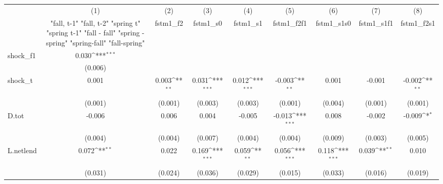 {
\def\sym#1{\ifmmode^{#1}\else\(^{#1}\)\fi}
\begin{tabular}{l*{8}{c}}
\toprule
            &\multicolumn{1}{c}{(1)}&\multicolumn{1}{c}{(2)}&\multicolumn{1}{c}{(3)}&\multicolumn{1}{c}{(4)}&\multicolumn{1}{c}{(5)}&\multicolumn{1}{c}{(6)}&\multicolumn{1}{c}{(7)}&\multicolumn{1}{c}{(8)}\\
            &\multicolumn{1}{c}{  "fall, t-1" "fall, t-2" "spring t" "spring t-1"  "fall - fall" "spring - spring" "spring-fall" "fall-spring" }&\multicolumn{1}{c}{fstm1\_f2}&\multicolumn{1}{c}{fstm1\_s0}&\multicolumn{1}{c}{fstm1\_s1}&\multicolumn{1}{c}{fstm1\_f2f1}&\multicolumn{1}{c}{fstm1\_s1s0}&\multicolumn{1}{c}{fstm1\_s1f1}&\multicolumn{1}{c}{fstm1\_f2s1}\\
\midrule
shock\_f1    &       0.030\sym{***}&                     &                     &                     &                     &                     &                     &                     \\
            &     (0.006)         &                     &                     &                     &                     &                     &                     &                     \\
\addlinespace
shock\_t     &       0.001         &       0.003\sym{**} &       0.031\sym{***}&       0.012\sym{***}&      -0.003\sym{**} &       0.001         &      -0.001         &      -0.002\sym{**} \\
            &     (0.001)         &     (0.001)         &     (0.003)         &     (0.003)         &     (0.001)         &     (0.004)         &     (0.001)         &     (0.001)         \\
\addlinespace
D.tot       &      -0.006         &       0.006         &       0.004         &      -0.005         &      -0.013\sym{***}&       0.008         &      -0.002         &      -0.009\sym{*}  \\
            &     (0.004)         &     (0.004)         &     (0.007)         &     (0.004)         &     (0.004)         &     (0.009)         &     (0.003)         &     (0.005)         \\
\addlinespace
L.netlend   &       0.072\sym{**} &       0.022         &       0.169\sym{***}&       0.059\sym{**} &       0.056\sym{***}&       0.118\sym{***}&       0.039\sym{**} &       0.010         \\
            &     (0.031)         &     (0.024)         &     (0.036)         &     (0.029)         &     (0.015)         &     (0.033)         &     (0.016)         &     (0.019)         \\

\end{tabular}}
